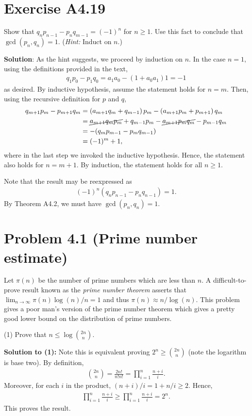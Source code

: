\documentclass{book}
\begin{document}
\section*{Exercise A4.19}
    Show that $q_n p_{n-1}-p_n q_{m-1}=(-1)^n$ for $n\geq 1$. Use this fact to conclude that $\gcd(p_n,q_n)=1$. (\emph{Hint:} Induct on $n$.)
    
    \textbf{Solution}: As the hint suggests, we proceed by induction on $n$. In the case $n=1$, using the definitions provided in the text,
    \begin{align}
        q_1 p_0-p_1 q_0 = a_1 a_0-(1+a_0 a_1)1 = -1
    \end{align}
    as desired. By inductive hypothesis, assume the statement holds for $n=m$. Then, using the recursive definition for $p$ and $q$,
    \begin{align}
        q_{m+1}p_m - p_{m+1}q_m &= \left(a_{m+1}q_m + q_{m-1}\right)p_m-\left(a_{m+1}p_m+p_{m+1}\right)q_m \\
        &= \cancel{a_{m+1}q_m p_m} + q_{m-1}p_m-\cancel{a_{m+1}p_m q_m} -p_{m-1}q_m \\
        &=-(q_m p_{m-1}-p_m q_{m-1}) \\
        &= (-1)^m+1,
    \end{align}
    where in the last step we invoked the inductive hypothesis. Hence, the statement also holds for $n=m+1$. By induction, the statement holds for all $n\geq 1$.
    
    Note that the result may be reexpressed as 
    \begin{align}
        (-1)^n(q_n p_{n-1}-p_n q_{n-1}) = 1.
    \end{align}
    By Theorem A4.2, we must have $\gcd(p_n,q_n)=1$.

\section*{Problem 4.1 (Prime number estimate)}
    Let $\pi(n)$ be the number of prime numbers which are less than $n$. A difficult-to-prove result known as the \emph{prime number theorem} asserts that $\lim_{n\rightarrow\infty} \pi(n)\log(n)/n=1$ and thus $\pi(n) \approx n/\log(n)$. This problem gives a poor man's version of the prime number theorem which gives a pretty good lower bound on the distribution of prime numbers.
    
    (1) Prove that $n\leq \log \binom{2n}{n}$. 

    \textbf{Solution to (1):} Note this is equivalent proving $2^n \geq {\binom{2n}{n}}$ (note the logarithm is base two). By definition,
    \begin{align}
        \binom{2n}{n} = \frac{2n!}{n!n!} = \prod_{i=1}^n \frac{n+i}{i}.
    \end{align}
    Moreover, for each $i$ in the product, $(n+i)/i  = 1 + n/i \geq 2$. Hence,
    \begin{align}
        \prod_{i=1}^n \frac{n+i}{i} \geq \prod_{i=1}^n \frac{n+i}{i} = 2^n.
    \end{align}
    This proves the result.
\end{document}

